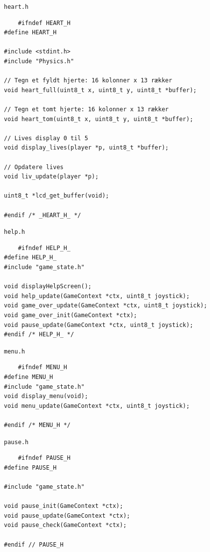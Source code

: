 \texttt{heart.h}
\begin{lstlisting}
    #ifndef HEART_H
#define HEART_H

#include <stdint.h>
#include "Physics.h"

// Tegn et fyldt hjerte: 16 kolonner x 13 rækker
void heart_full(uint8_t x, uint8_t y, uint8_t *buffer);

// Tegn et tomt hjerte: 16 kolonner x 13 rækker
void heart_tom(uint8_t x, uint8_t y, uint8_t *buffer);

// Lives display 0 til 5
void display_lives(player *p, uint8_t *buffer);

// Opdatere lives
void liv_update(player *p);

uint8_t *lcd_get_buffer(void);

#endif /* _HEART_H_ */
\end{lstlisting}

\texttt{help.h}
\begin{lstlisting}
    #ifndef HELP_H_
#define HELP_H_
#include "game_state.h"

void displayHelpScreen();
void help_update(GameContext *ctx, uint8_t joystick);
void game_over_update(GameContext *ctx, uint8_t joystick);
void game_over_init(GameContext *ctx);
void pause_update(GameContext *ctx, uint8_t joystick);
#endif /* HELP_H_ */
\end{lstlisting}

\texttt{menu.h}
\begin{lstlisting}
    #ifndef MENU_H
#define MENU_H
#include "game_state.h"
void display_menu(void);
void menu_update(GameContext *ctx, uint8_t joystick);

#endif /* MENU_H */
\end{lstlisting}

\texttt{pause.h}
\begin{lstlisting}
    #ifndef PAUSE_H
#define PAUSE_H

#include "game_state.h"

void pause_init(GameContext *ctx);
void pause_update(GameContext *ctx);
void pause_check(GameContext *ctx);

#endif // PAUSE_H
\end{lstlisting}

